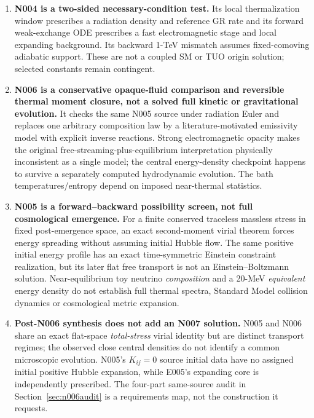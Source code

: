 \documentclass[11pt,a4paper]{article}
\theoremstyle{tmon}
\theoremstyle{definition}
\begin{document}
\begin{enumerate}[label=\textbf{R\arabic*.}]
\item \textbf{N004 is a two-sided necessary-condition test.} Its local thermalization window prescribes a radiation density and reference GR rate and its forward weak-exchange ODE prescribes a fast electromagnetic stage and local expanding background. Its backward 1-TeV mismatch assumes fixed-comoving adiabatic support. These are not a coupled SM or TUO origin solution; selected constants remain contingent.

\item \textbf{N006 is a conservative opaque-fluid comparison and reversible thermal moment closure, not a solved full kinetic or gravitational evolution.} It checks the same N005 source under radiation Euler and replaces one arbitrary composition law by a literature-motivated emissivity model with explicit inverse reactions. Strong electromagnetic opacity makes the original free-streaming-plus-equilibrium interpretation physically inconsistent as a single model; the central energy-density checkpoint happens to survive a separately computed hydrodynamic evolution. The bath temperatures/entropy depend on imposed near-thermal statistics.
\item \textbf{N005 is a forward--backward possibility screen, not full cosmological emergence.} For a finite conserved traceless massless stress in fixed post-emergence space, an exact second-moment virial theorem forces energy spreading without assuming initial Hubble flow. The same positive initial energy profile has an exact time-symmetric Einstein constraint realization, but its later flat free transport is not an Einstein--Boltzmann solution. Near-equilibrium toy neutrino \emph{composition} and a 20-MeV \emph{equivalent} energy density do not establish full thermal spectra, Standard Model collision dynamics or cosmological metric expansion.

\item \textbf{Post-N006 synthesis does not add an N007 solution.} N005 and N006 share an exact flat-space \emph{total-stress} virial identity but are distinct transport regimes; the observed close central densities do not identify a common microscopic evolution. N005's $K_{ij}=0$ source initial data have no assigned initial positive Hubble expansion, while E005's expanding core is independently prescribed. The four-part same-source audit in Section~\ref{sec:n006audit} is a requirements map, not the construction it requests.


\end{enumerate}
\end{document}

